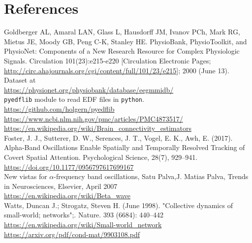 \documentclass[%
 aip,
 jmp,%
 amsmath,amssymb,
 reprint,%
]{revtex4-1}
\begin{document}
\section{References}
\begin{thebibliography}{}
	Goldberger AL, Amaral LAN, Glass L, Hausdorff JM, Ivanov PCh, Mark RG, Mietus JE, Moody GB, Peng C-K, Stanley HE. PhysioBank, PhysioToolkit, and PhysioNet: Components of a New Research Resource for Complex Physiologic Signals. Circulation 101(23):e215-e220 [Circulation Electronic Pages; \url{http://circ.ahajournals.org/cgi/content/full/101/23/e215}]; 2000 (June 13). Dataset at \\
	\url{https://physionet.org/physiobank/database/eegmmidb/}\\
	
	 \verb|pyedflib| module to read EDF files in \verb|python|. \url{https://github.com/holgern/pyedflib}\\
	
	\url{https://www.ncbi.nlm.nih.gov/pmc/articles/PMC4873517/}\\
	
	\url{https://en.wikipedia.org/wiki/Brain_connectivity_estimators}\\
	
	Foster, J. J., Sutterer, D. W., Serences, J. T., Vogel, E. K., Awh, E. (2017). Alpha-Band Oscillations Enable Spatially and Temporally Resolved Tracking of Covert Spatial Attention. Psychological Science, 28(7), 929–941. \url{https://doi.org/10.1177/0956797617699167}\\
	
	New vistas for $\alpha$-frequency band oscillations, Satu Palva,J. Matias Palva, Trends in Neurosciences, Elsevier, April 2007\\
	
	\url{https://en.wikipedia.org/wiki/Beta_wave}\\
	
	Watts, Duncan J.; Strogatz, Steven H. (June 1998). "Collective dynamics of small-world; networks";. Nature. 393 (6684): 440–442\\
	
	\url{https://en.wikipedia.org/wiki/Small-world_network}\\
	
	\url{https://arxiv.org/pdf/cond-mat/9903108.pdf}\\


\end{thebibliography}
\end{document}
